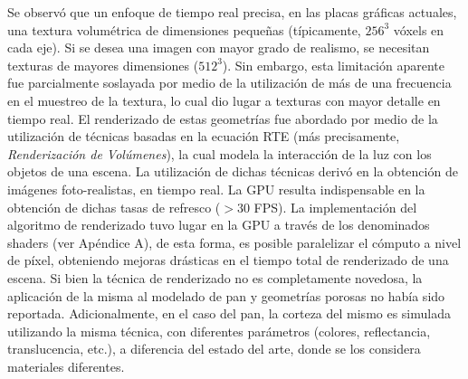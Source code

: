 Se observó que un enfoque de tiempo real precisa, en las placas gráficas actuales, una textura volumétrica de dimensiones pequeñas (típicamente, $256^{3}$ vóxels en cada eje).
Si se desea una imagen con mayor grado de realismo, se necesitan texturas de mayores dimensiones ($512^{3}$).
Sin embargo, esta limitación aparente fue parcialmente soslayada por medio de la utilización de más de una frecuencia en el muestreo de la textura, lo cual dio lugar a texturas con mayor detalle en tiempo real.
El renderizado de estas geometrías fue abordado por medio de la utilización de técnicas basadas en la ecuación RTE (más precisamente, {\em Renderización de Volúmenes}), la cual modela la interacción de la luz con los objetos de una escena.
La utilización de dichas técnicas derivó en la obtención de imágenes foto-realistas, en tiempo real.
La GPU resulta indispensable en la obtención de dichas tasas de refresco ($> 30 $ FPS).
La implementación del algoritmo de renderizado tuvo lugar en la GPU a través de los denominados shaders (ver Apéndice A), de esta forma, es posible paralelizar el cómputo a nivel de píxel, obteniendo mejoras drásticas en el tiempo total de renderizado de una escena.
Si bien la técnica de renderizado no es completamente novedosa, la aplicación de la misma al modelado de pan y geometrías porosas no había sido reportada.
Adicionalmente, en el caso del pan, la corteza del mismo es simulada utilizando la misma técnica, con diferentes parámetros (colores, reflectancia, translucencia, etc.), a diferencia del estado del arte, donde se los considera materiales diferentes.


